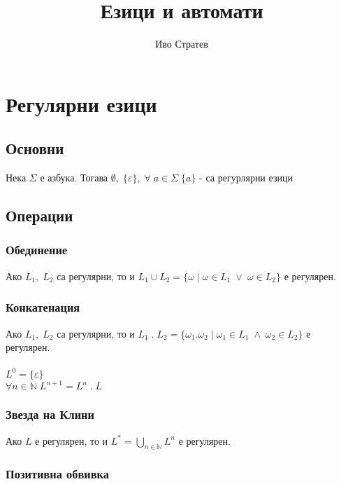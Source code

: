 \documentclass[12pt]{article}
\title{Езици и автомати}
\author{Иво Стратев}
\newcommand{\N}{\mathbb{N}}
\begin{document}
\maketitle

\section*{Регулярни езици}

\subsection*{Основни}

Нека $\Sigma$ е азбука. Тогава $\emptyset, \; \{\varepsilon\}, \; \forall \; a \in \Sigma \; \{a\}$ - са регурлярни езици

\subsection*{Операции}

\subsubsection*{Обединение}

Ако $L_1, \; L_2$ са регулярни, то и $L_1 \cup L_2 = \{\omega \; | \; \omega \in L_1 \; \lor \; \omega \in L_2 \}$ е регулярен.

\subsubsection*{Конкатенация}

Ако $L_1, \; L_2$ са регулярни, то и $L_1 \; . \; L_2 = \{\omega_1.\omega_2 \; | \; \omega_1 \in L_1 \; \land \; \omega_2 \in L_2\}$ е регулярен. \\\\

$L^0 = \{\varepsilon\}$ \\

$\forall n \in \N \; L^{n + 1} = L^n\;.\;L $

\subsubsection*{Звезда на Клини}

Ако $L$ е регулярен, то и $L^* = \displaystyle\bigcup_{n \in \N} L^n$ е регулярен.

\subsubsection*{Позитивна обвивка}
\end{document}
